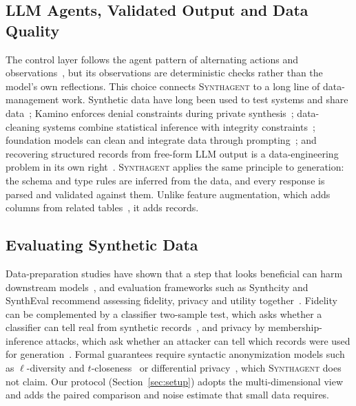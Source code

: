 \documentclass[conference]{IEEEtran}
\newcommand{\system}{\textsc{Synthagent}\xspace}
\providecommand{\DIFaddend}{} %
\DeclareRobustCommand{\DIFaddend}{\DIFOaddend \let\includegraphics\DIFOincludegraphics} %
\begin{document}
\DIFaddend \subsection{LLM Agents, Validated Output and Data Quality}
The control layer follows the agent pattern of alternating actions and observations~\cite{yao2023react,wang2024agentsurvey}, but its observations are deterministic checks rather than the model's own reflections. This choice connects \system to a long line of data-management work. Synthetic data have long been used to test systems and share data~\cite{sanghi2023enterprise,fan2020relational}; Kamino enforces denial constraints during private synthesis~\cite{ge2021kamino}; data-cleaning systems combine statistical inference with integrity constraints~\cite{chu2013holistic,qin2024bclean}; foundation models can clean and integrate data through prompting~\cite{narayan2022wrangle}; and recovering structured records from free-form LLM output is a data-engineering problem in its own right~\cite{rorseth2026recovering}. \system applies the same principle to generation: the schema and type rules are inferred from the data, and every response is parsed and validated against them. Unlike feature augmentation, which adds columns from related tables~\cite{liang2025featpilot}, it adds records.

\subsection{Evaluating Synthetic Data}
Data-preparation studies have shown that a step that looks beneficial can harm downstream models~\cite{li2021cleanml,guha2023cleaningfairness}, and evaluation frameworks such as Synthcity and SynthEval recommend assessing fidelity, privacy and utility together~\cite{qian2023synthcity,lautrup2025syntheval}. Fidelity can be complemented by a classifier two-sample test, which asks whether a classifier can tell real from synthetic records~\cite{lopezpaz2017c2st}, and privacy by membership-inference attacks, which ask whether an attacker can tell which records were used for generation~\cite{shokri2017mia,hyeong2022tabularmia}. Formal guarantees require syntactic anonymization models such as $\ell$-diversity and $t$-closeness~\cite{machanavajjhala2006ldiversity,li2007tcloseness} or differential privacy~\cite{dwork2014dp}, which \system does not claim. Our protocol (Section~\ref{sec:setup}) adopts the multi-dimensional view and adds the paired comparison and noise estimate that small data requires.
\end{document}
